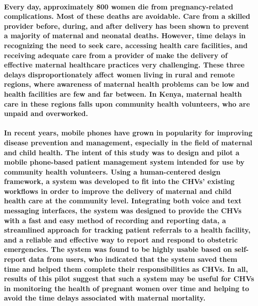 \abstract


\paragraph{Every day, approximately 800 women die from pregnancy-related complications. Most of these deaths are avoidable. Care from a skilled provider before, during, and after delivery has been shown to prevent a majority of maternal and neonatal deaths. However, time delays in recognizing the need to seek care, accessing health care facilities, and receiving adequate care from a provider of make the delivery of effective maternal healthcare practices very challenging. These three delays disproportionately affect women living in rural and remote regions, where awareness of maternal health problems can be low and health facilities are few and far between. In Kenya, maternal health care in these regions falls upon community health volunteers, who are unpaid and overworked.}

\paragraph{In recent years, mobile phones have grown in popularity for improving disease prevention and management, especially in the field of maternal and child health. The intent of this study was to design and pilot a mobile phone-based patient management system intended for use by community health volunteers. Using a human-centered design framework, a system was developed to fit into the CHVs' existing workflows in order to improve the delivery of maternal and child health care at the community level. Integrating both voice and text messaging interfaces, the system was designed to provide the CHVs with a fast and easy method of recording and reporting data, a streamlined approach for tracking patient referrals to a health facility, and a reliable and effective way to report and respond to obstetric emergencies. The system was found to be highly usable based on self-report data from users, who indicated that the system saved them time and helped them complete their responsibilities as CHVs. In all, results of this pilot suggest that such a system may be useful for CHVs in monitoring the health of pregnant women over time and helping to avoid the time delays associated with maternal mortality.}